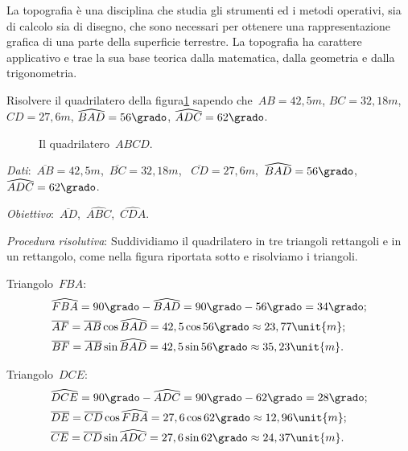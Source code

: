 La topografia è una disciplina che studia gli strumenti ed i metodi 
operativi, 
sia di calcolo sia di disegno, che sono necessari per ottenere
una rappresentazione grafica di una parte della superficie terrestre.
La topografia ha carattere applicativo e trae la sua base teorica dalla 
matematica, dalla geometria e dalla trigonometria.

 \begin{esempio}
Risolvere il quadrilatero della figura\ref{fig:G.7} sapendo 
che~\(AB=42,5\unit{m}\), \(BC=32,18\unit{m}\), \(CD=27,6\unit{m}\),
\(\widehat{BAD}=56\grado\), \(\widehat{ADC}=62\grado\).
\begin{inaccessibleblock}
 \begin{figure}[t]
\begin{center}\scalebox{0.8}{\quadrilatero}\end{center}
%
\caption{Il quadrilatero~\(ABCD\).}\label{fig:G.7}
\end{figure}
\end{inaccessibleblock}

\emph{Dati}:~\(\overline{AB}=42,5\unit{m}\),\quad~\(\overline{BC}=32,18\unit{m}\),
\quad~\(\overline{CD}=27,6\unit{m}\),\quad~\(\widehat{BAD}=56\grado\),
\quad~\(\widehat{ADC}=62\grado\).

\emph{Obiettivo}:~\(\overline{AD}\),\quad~\(\widehat{ABC}\),\quad~\(\widehat{CDA}\).

\emph{Procedura risolutiva}:
Suddividiamo il quadrilatero in tre triangoli rettangoli e in un rettangolo, 
come nella figura riportata sotto e risolviamo i triangoli.

Triangolo~\(FBA\):
\begin{align*}
&\widehat{FBA}=90\grado-\widehat{BAD}=90\grado-56\grado=34\grado;\\
&\overline{AF}=\overline{AB}\cos \widehat{BAD} = 42,5\cos 56\grado \approx23,
77\unit{m};\\
&\overline{BF}=\overline{AB}\sin \widehat{BAD} =42,5 \sin 56\grado\approx35,
23\unit{m}.
\end{align*}

Triangolo~\(DCE\):
\begin{align*}
 &\widehat{DCE}=90\grado-\widehat{ADC}=90\grado-62\grado=28\grado;\\
&\overline{DE}=\overline{CD}\cos \widehat{FBA}=27,6\cos 62\grado \approx12,
96\unit{m};\\
&\overline{CE}=\overline{CD}\sin \widehat{ADC} =27,6 \sin 62\grado \approx24,
37\unit{m}.
\end{align*}


\end{esempio}
